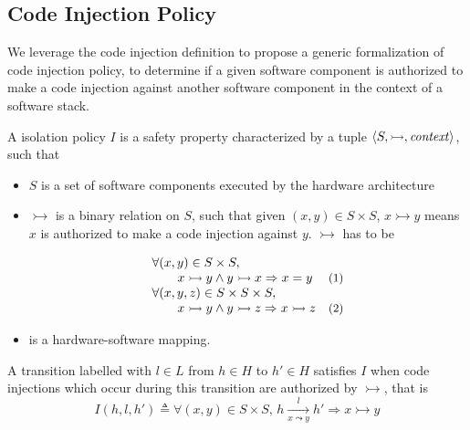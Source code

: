 \subsection{Code Injection Policy}
\label{subsec:speccert:globalsec}

We leverage the code injection definition to propose a generic formalization of
code injection policy, to determine if a given software component is authorized
to make a code injection against another software component in the context of a
software stack.

\begin{definition}
  \label{def:speccert:global}
  A isolation policy \( I \) is a safety property characterized by a tuple
  \( \langle S, \rightarrowtail, \mathit{context} \rangle \), such that
  \begin{itemize}
  \item \( S \) is a set of software components executed by the hardware
    architecture
  \item \( \rightarrowtail \) is a binary relation on \( S \), such that given
    \( (x, y) \in S \times S \), \( x \rightarrowtail y \) means \( x \) is
    authorized to make a code injection against \( y \).
    \( \rightarrowtail \) has to be
    \[
      \begin{array}{lr}
        \forall (x, y) \in S \times S,
        & \\
        \qquad x \rightarrowtail y \wedge y
        \rightarrowtail x \Rightarrow x = y
        & \text{\small (1)} \\
        \forall (x, y, z) \in S \times S \times S,
        & \\
        \qquad x \rightarrowtail y \wedge y
        \rightarrowtail z \Rightarrow x \rightarrowtail z
        & \text{\small (2)}
      \end{array}
    \]
  \item {} is a hardware-software mapping.
  \end{itemize}

  A transition labelled with \( l \in L \) from \( h \in H \) to \( h' \in H \)
  satisfies \( I \) when code injections which occur during this transition are
  authorized by \( \rightarrowtail \), that is
  \[
    I(h, l, h') \triangleq \forall (x, y) \in S \times S \text{, } h
    \xrightarrow[x \leadsto y]{l} h' \Rightarrow x \rightarrowtail y
  \]
\end{definition}

